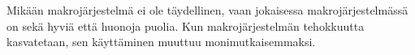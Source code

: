 Mikään makrojärjestelmä ei ole täydellinen, vaan jokaisessa makrojärjestelmässä
on sekä hyviä että huonoja puolia. Kun makrojärjestelmän tehokkuutta
kasvatetaan, sen käyttäminen muuttuu monimutkaisemmaksi.

%
%
%
%
%
%
%
%
%

%

%
